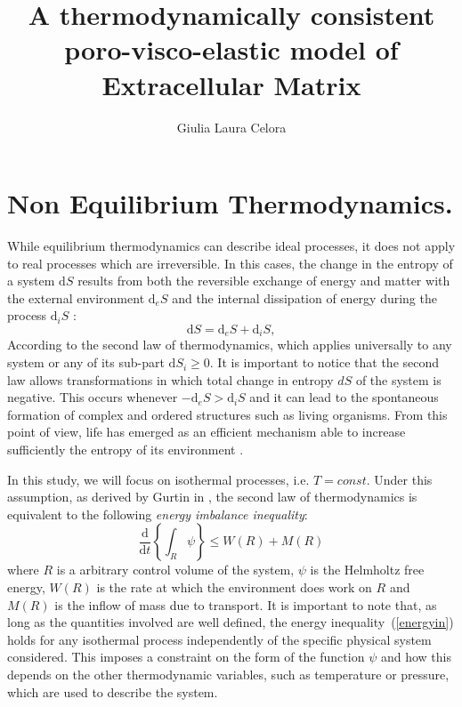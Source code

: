 \documentclass[runningheads]{llncs}
\renewcommand{\d}{\ensuremath{\text{d}}}
\begin{document}
%
\title{A thermodynamically consistent poro-visco-elastic model of Extracellular Matrix}
%
%
\author{Giulia Laura Celora}
%
%
%
\maketitle              %
%
\begin{abstract}

\end{abstract}
%
%
%


\section{Non Equilibrium Thermodynamics.}
\label{secNET}
While equilibrium thermodynamics can describe ideal processes, it does not apply to real processes which are irreversible. In this cases, the change in the entropy of a system $\d S$ results from both the reversible exchange of energy and matter with the external environment $\d_eS$ and the internal dissipation of energy during the process $\d_iS$ \cite{NET}:
\begin{equation}
\d S = \d_eS + \d_iS, 
\end{equation}
According to the second law of thermodynamics, which applies universally to any system or any of its sub-part $\d S_i\ge 0$. It is important to notice that the second law allows transformations in which total change in entropy $d S$ of the system is negative. This occurs whenever $-\d_e S>\d_i S$ and it can lead to the spontaneous formation of complex and ordered structures such as living organisms. From this point of view, life has emerged as an efficient mechanism able to increase sufficiently the entropy of its environment \cite{JeremyEngland}.  

In this study, we will focus on isothermal processes, i.e. $T=const$. Under this assumption, as derived by Gurtin in \cite{GURTIN}, the second law of thermodynamics is equivalent to the following \textit{energy imbalance inequality}:
\begin{equation}
\frac{\d}{\d t} \left\{\int_R \psi \right\}\leq W(R) + M(R) \label{energyin}
\end{equation}
where $R$ is a arbitrary control volume of the system, $\psi$ is the Helmholtz free energy, $W(R)$ is the rate at which the environment does work on $R$ and $M(R)$ is the inflow of mass due to transport. It is important to note that, as long as the quantities involved are well defined, the energy inequality~(\ref{energyin}) holds for any isothermal process independently of the specific physical system considered. This imposes a constraint on the form of the function $\psi$ and how this depends on the other thermodynamic variables, such as temperature or pressure, which are used to describe the system. 
\end{document}
